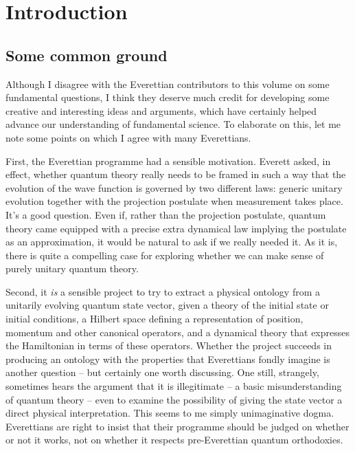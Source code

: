 \documentclass[aps,
pra,epsfig]{revtex4}
\begin{document}
\section{Introduction}

\subsection{Some common ground}

Although I disagree with the
Everettian contributors to this volume on some fundamental questions, 
I think they deserve much credit for developing some creative
and interesting ideas and arguments, which have
certainly helped advance our understanding of fundamental science. 
To elaborate on this, let me note some points on which I
agree with many Everettians.   

First, the Everettian programme had a sensible motivation.  Everett
asked\cite{everettone}, in effect, whether 
quantum theory really needs to be framed
in such a way that the evolution of the wave function is governed
by two different laws: generic unitary evolution together with the
projection postulate when measurement takes place.  
It's a good question.  Even if, rather than the projection postulate, 
quantum theory came equipped with a precise extra dynamical law
implying the postulate as an approximation, it would be natural to ask
if we really needed it.  As it is, there 
is quite a compelling case for exploring
whether we can make sense of purely unitary quantum theory.

Second, it {\it is} a sensible project to try to extract a physical
ontology from a unitarily evolving quantum state vector, given a
theory of the initial state or initial conditions, a Hilbert space
defining a representation of position, momentum and other canonical
operators, and a dynamical theory that expresses the Hamiltonian in
terms of these operators.  Whether the project succeeds
in producing an ontology with the properties that Everettians
fondly imagine is another question -- but certainly one worth discussing. 
One still, strangely, sometimes hears the argument that it is
illegitimate -- a basic misunderstanding of quantum theory -- even to
examine the possibility of giving the state vector a direct physical
interpretation.  This seems to me simply unimaginative dogma.
Everettians are right to insist that their programme 
should be judged on whether or not it works, not on whether it respects 
pre-Everettian quantum orthodoxies.
\end{document}
